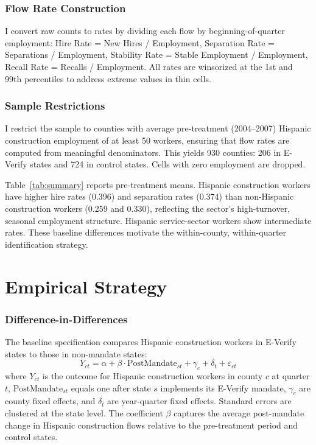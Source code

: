 \documentclass[12pt]{article}
\begin{document}
\subsubsection*{Flow Rate Construction} I convert raw counts to rates by dividing each flow by beginning-of-quarter employment: Hire Rate = New Hires / Employment, Separation Rate = Separations / Employment, Stability Rate = Stable Employment / Employment, Recall Rate = Recalls / Employment. All rates are winsorized at the 1st and 99th percentiles to address extreme values in thin cells.

\subsubsection*{Sample Restrictions} I restrict the sample to counties with average pre-treatment (2004--2007) Hispanic construction employment of at least 50 workers, ensuring that flow rates are computed from meaningful denominators. This yields 930 counties: 206 in E-Verify states and 724 in control states. Cells with zero employment are dropped.



Table~\ref{tab:summary} reports pre-treatment means. Hispanic construction workers have higher hire rates (0.396) and separation rates (0.374) than non-Hispanic construction workers (0.259 and 0.330), reflecting the sector's high-turnover, seasonal employment structure. Hispanic service-sector workers show intermediate rates. These baseline differences motivate the within-county, within-quarter identification strategy.

\section{Empirical Strategy}
\label{sec:strategy}

\subsubsection*{Difference-in-Differences} The baseline specification compares Hispanic construction workers in E-Verify states to those in non-mandate states:
\begin{equation}
Y_{ct} = \alpha + \beta \cdot \text{PostMandate}_{st} + \gamma_c + \delta_t + \varepsilon_{ct}
\label{eq:dd}
\end{equation}
where $Y_{ct}$ is the outcome for Hispanic construction workers in county $c$ at quarter $t$, $\text{PostMandate}_{st}$ equals one after state $s$ implements its E-Verify mandate, $\gamma_c$ are county fixed effects, and $\delta_t$ are year-quarter fixed effects. Standard errors are clustered at the state level. The coefficient $\beta$ captures the average post-mandate change in Hispanic construction flows relative to the pre-treatment period and control states.
\end{document}
